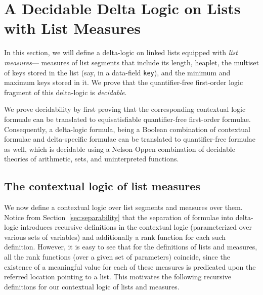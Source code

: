 \section{A Decidable Delta Logic on Lists with List Measures}
\label{sec:decidability}
In this section, we will define a delta-logic on linked lists equipped with \emph{list measures}--- measures of
list segments that include its length, heaplet, the multiset of keys stored in the list (say, in a data-field {\tt key}),
and the minimum and maximum keys stored in it. We prove that the quantifier-free first-order logic fragment of this delta-logic 
is \emph{decidable}. 

We prove decidability by first proving that the corresponding contextual logic formuale can be translated to equisatisfiable quantifier-free first-order
formulae. Consequently, a delta-logic formula, being a Boolean combination of contextual formulae and delta-specific
formulae can be translated to quantifier-free formulae as well, which is decidable using a Nelson-Oppen combination of decidable theories of arithmetic, sets, and uninterpreted functions.


\subsection*{The contextual logic of list measures}
We  now define a contextual logic over list segments and measures over them. Notice from Section~\ref{sec:separability} that the separation of formulae into delta-logic introduces recursive definitions in the contextual logic (parameterized over various sets of variables) and additionally a rank function for each such definition. However, it is easy to see that for the definitions of lists and measures, all the rank functions (over a given set of parameters) coincide, since the existence of a meaningful value for each of these measures is predicated upon the referred location pointing to a list. This motivates the following recursive definitions for our contextual logic of lists and measures.

